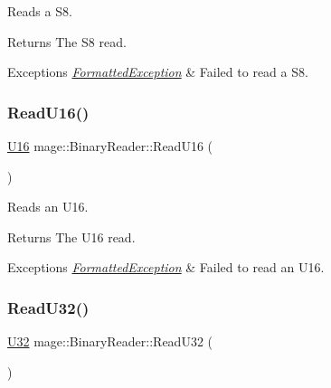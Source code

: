 Reads a {\ttfamily S8}.

\begin{DoxyReturn}{Returns}
The {\ttfamily S8} read. 
\end{DoxyReturn}

\begin{DoxyExceptions}{Exceptions}
{\em \hyperlink{classmage_1_1_formatted_exception}{Formatted\+Exception}} & Failed to read a {\ttfamily S8}. \\
\hline
\end{DoxyExceptions}
\hypertarget{classmage_1_1_binary_reader_a2b65c66fcb0b590d6f7ab5a8ffd96b83}{}\label{classmage_1_1_binary_reader_a2b65c66fcb0b590d6f7ab5a8ffd96b83} 
\subsubsection{\texorpdfstring{Read\+U16()}{ReadU16()}}
{\footnotesize\ttfamily \hyperlink{namespacemage_af69057eec1ce005c1c3b34ae33486f16}{U16} mage\+::\+Binary\+Reader\+::\+Read\+U16 (\begin{DoxyParamCaption}{ }\end{DoxyParamCaption})\hspace{0.3cm}{\ttfamily [protected]}}

Reads an {\ttfamily U16}.

\begin{DoxyReturn}{Returns}
The {\ttfamily U16} read. 
\end{DoxyReturn}

\begin{DoxyExceptions}{Exceptions}
{\em \hyperlink{classmage_1_1_formatted_exception}{Formatted\+Exception}} & Failed to read an {\ttfamily U16}. \\
\hline
\end{DoxyExceptions}
\hypertarget{classmage_1_1_binary_reader_acb2d579ef62fd3cd5b3c6193d748dda8}{}\label{classmage_1_1_binary_reader_acb2d579ef62fd3cd5b3c6193d748dda8} 
\subsubsection{\texorpdfstring{Read\+U32()}{ReadU32()}}
{\footnotesize\ttfamily \hyperlink{namespacemage_a41c104c036fba3756a74e19f793eeaa1}{U32} mage\+::\+Binary\+Reader\+::\+Read\+U32 (\begin{DoxyParamCaption}{ }\end{DoxyParamCaption})\hspace{0.3cm}{\ttfamily [protected]}}

